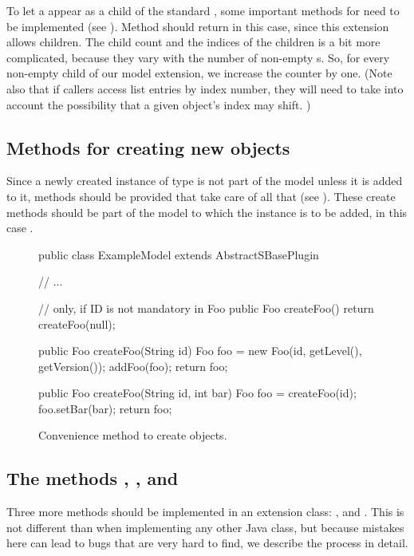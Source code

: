 To let a  appear as a child of the standard \Model, some
important methods for \TreeNode need to be implemented (see
).  Method  should
return  in this case, since this extension allows children.  The
child count and the indices of the children is a bit more complicated,
because they vary with the number of non-empty s.  So, for
every non-empty  child of our model extension, we increase the
counter by one.  (Note also that if callers access list entries by index
number, they will need to take into account the possibility that a given
object's index may shift. )


\subsection{Methods for creating new objects}

Since a newly created instance of type  is not part of the model
unless it is added to it,  methods should be provided that
take care of all that (see ).
These create methods should be part of the model to which the 
instance is to be added, in this case .

\begin{figure}[thb]
  \begin{example}[numbers=left]
public class ExampleModel extends AbstractSBasePlugin {

  // ...

  // only, if ID is not mandatory in Foo
  public Foo createFoo() {
    return createFoo(null);
  }

  public Foo createFoo(String id) {
    Foo foo = new Foo(id, getLevel(), getVersion());
    addFoo(foo);
    return foo;
  }

  public Foo createFoo(String id, int bar) {
    Foo foo = createFoo(id);
    foo.setBar(bar);
    return foo;
  }
}\end{example}
  \caption{Convenience method to create  objects.}
  \label{lst:ModelExtCreateMethods}
\end{figure}


\subsection{The methods , , and }

Three more methods should be implemented in an extension
class: ,  and .  This is not
different than when implementing any other Java class, but because mistakes
here can lead to bugs that are very hard to find, we describe the process in
detail.


